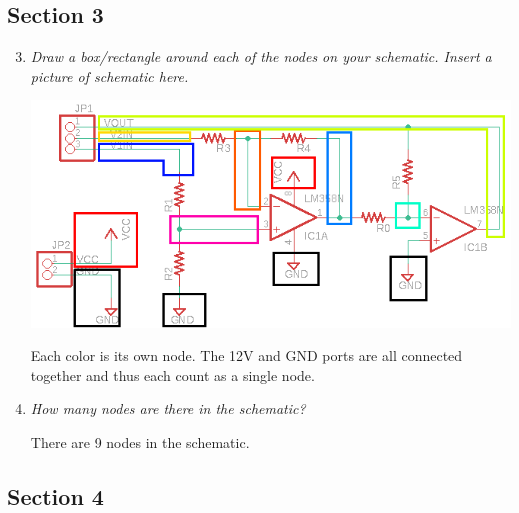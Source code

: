\documentclass[12pt]{article}
\begin{document}
\subsection*{Section 3}

\begin{enumerate}
    \setcounter{enumi}{2}
    \item {
        \textit{Draw a box/rectangle around each of the nodes on your schematic. Insert a picture of
        schematic here.}
       
        \includegraphics[width=.8\linewidth]{revsch-nodes.png}
        
        Each color is its own node. The 12V and GND ports are all connected together and thus each count as a 
        single node.
    }  
    \item {
        \textit{How many nodes are there in the schematic?}

        There are 9 nodes in the schematic.  
    }
\end{enumerate}

\subsection*{Section 4}
\end{document}
